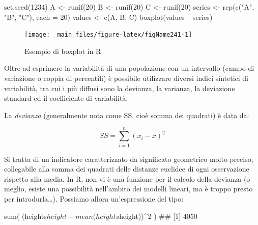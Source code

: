 \documentclass[a4paper,12pt,oneside]{book}
\newenvironment{Shaded}{}{}
\newcommand{\KeywordTok}[1]{#1}
\newcommand{\DataTypeTok}[1]{#1}
\newcommand{\DecValTok}[1]{#1}
\newcommand{\StringTok}[1]{#1}
\newcommand{\CommentTok}[1]{#1}
\newcommand{\OperatorTok}[1]{#1}
\newcommand{\NormalTok}[1]{#1}
\begin{document}
\begin{Shaded}
\begin{Highlighting}[]
\KeywordTok{set.seed}\NormalTok{(}\DecValTok{1234}\NormalTok{)}
\NormalTok{A <-}\StringTok{ }\KeywordTok{runif}\NormalTok{(}\DecValTok{20}\NormalTok{)}
\NormalTok{B <-}\StringTok{ }\KeywordTok{runif}\NormalTok{(}\DecValTok{20}\NormalTok{)}
\NormalTok{C <-}\StringTok{ }\KeywordTok{runif}\NormalTok{(}\DecValTok{20}\NormalTok{)}
\NormalTok{series <-}\StringTok{ }\KeywordTok{rep}\NormalTok{(}\KeywordTok{c}\NormalTok{(}\StringTok{"A"}\NormalTok{, }\StringTok{"B"}\NormalTok{, }\StringTok{"C"}\NormalTok{), }\DataTypeTok{each =} \DecValTok{20}\NormalTok{)}
\NormalTok{values <-}\StringTok{ }\KeywordTok{c}\NormalTok{(A, B, C)}
\KeywordTok{boxplot}\NormalTok{(values }\OperatorTok{~}\StringTok{ }\NormalTok{series)}
\end{Highlighting}
\end{Shaded}

\begin{figure}

{\centering \texttt{[image: \_main\_files/figure-latex/figName241-1]} 

}

\caption{Esempio di boxplot in R}\label{fig:figName241}
\end{figure}

Oltre ad esprimere la variabilità di una popolazione con un intervallo (campo di variazione o coppia di percentili) è possibile utilizzare diversi indici sintetici di variabilità, tra cui i più diffusi sono la devianza, la varianza, la deviazione standard ed il coefficiente di variabilità.

La \emph{devianza} (generalmente nota come SS, cioè somma dei quadrati) è data da:

\[SS = \sum\limits_{i = 1}^n {(x_i  - \bar x)^2 }\]

Si tratta di un indicatore caratterizzato da significato geometrico molto preciso, collegabile alla somma dei quadrati delle distanze euclidee di ogni osservazione rispetto alla media. In R, non vi è una funzione per il calcolo della devianza (o meglio, esiste una possibilità nell'ambito dei modelli lineari, ma è troppo presto per introdurla\ldots{}). Possiamo allora un'espressione del tipo:

\begin{Shaded}
\begin{Highlighting}[]
\KeywordTok{sum}\NormalTok{( (heights}\OperatorTok{$}\NormalTok{height }\OperatorTok{-}\StringTok{ }\KeywordTok{mean}\NormalTok{(heights}\OperatorTok{$}\NormalTok{height))}\OperatorTok{^}\DecValTok{2}\NormalTok{ )}
\CommentTok{## [1] 4050}
\end{Highlighting}
\end{Shaded}
\end{document}
